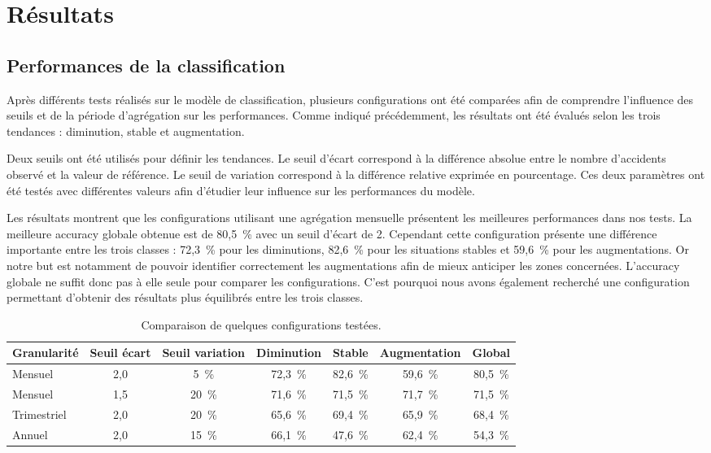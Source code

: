 \documentclass[12pt, a4paper]{report}
\begin{document}
\chapter{Résultats}

\section{Performances de la classification}

Après différents tests réalisés sur le modèle de classification, plusieurs configurations ont été comparées afin de comprendre l'influence des seuils et de la période d'agrégation sur les performances. Comme indiqué précédemment, les résultats ont été évalués selon les trois tendances : diminution, stable et augmentation.

Deux seuils ont été utilisés pour définir les tendances. Le seuil d'écart correspond à la différence absolue entre le nombre d'accidents observé et la valeur de référence. Le seuil de variation correspond à la différence relative exprimée en pourcentage. Ces deux paramètres ont été testés avec différentes valeurs afin d'étudier leur influence sur les performances du modèle.

Les résultats montrent que les configurations utilisant une agrégation mensuelle présentent les meilleures performances dans nos tests. La meilleure accuracy globale obtenue est de 80,5~\% avec un seuil d'écart de 2. Cependant cette configuration présente une différence importante entre les trois classes : 72,3~\% pour les diminutions, 82,6~\% pour les situations stables et 59,6~\% pour les augmentations. Or notre but est notamment de pouvoir identifier correctement les augmentations afin de mieux anticiper les zones concernées. L'accuracy globale ne suffit donc pas à elle seule pour comparer les configurations. C'est pourquoi nous avons également recherché une configuration permettant d'obtenir des résultats plus équilibrés entre les trois classes.

\begin{table}[H]
  \centering
  \footnotesize
  \setlength{\tabcolsep}{3pt}
  \begin{tabular}{lcccccc}
    \toprule
    \textbf{Granularité} & \textbf{Seuil écart} & \textbf{Seuil variation} & \textbf{Diminution} & \textbf{Stable} & \textbf{Augmentation} & \textbf{Global} \\
    \midrule
    Mensuel     & 2,0 & 5~\%  & 72,3~\% & 82,6~\% & 59,6~\% & 80,5~\% \\
    Mensuel     & 1,5 & 20~\% & 71,6~\% & 71,5~\% & 71,7~\% & 71,5~\% \\
    Trimestriel & 2,0 & 20~\% & 65,6~\% & 69,4~\% & 65,9~\% & 68,4~\% \\
    Annuel      & 2,0 & 15~\% & 66,1~\% & 47,6~\% & 62,4~\% & 54,3~\% \\
    \bottomrule
  \end{tabular}
  \caption{Comparaison de quelques configurations testées.}
  \label{tab:resultats}
\end{table}
\end{document}
